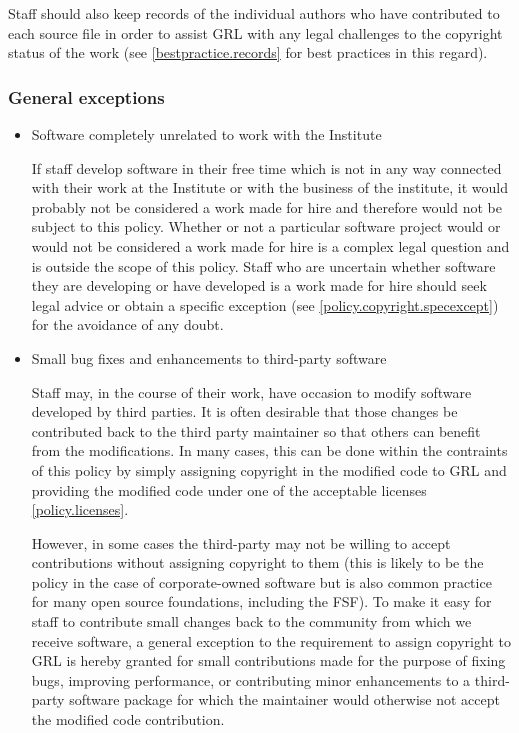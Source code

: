 \documentclass[10pt,a4paper]{article}
\begin{document}
\par Staff should also keep records of the individual authors who have contributed to 
each source file in order to assist GRL with any legal challenges to the copyright 
status of the work (see \ref{bestpractice.records} for best practices in this regard). 


\subsubsection{General exceptions}
\label{policy.copyright.genexcept}
\begin{itemize}

\item Software completely unrelated to work with the Institute

\par If staff develop software in their free time which is not in any way connected 
with their work at the Institute or with the business of the institute, it would 
probably not be considered a work made for hire and therefore would not be 
subject to this policy. Whether or not a particular software project would or 
would not be considered a work made for hire is a complex legal question and 
is outside the scope of this policy. Staff who are uncertain whether software 
they are developing or have developed is a work made for hire should seek 
legal advice or obtain a specific exception (see \ref{policy.copyright.specexcept}) 
for the avoidance of any doubt. 

\item Small bug fixes and enhancements to third-party software

\par Staff may, in the course of their work, have occasion to modify software 
developed by third parties. It is often desirable that those changes be contributed 
back to the third party maintainer so that others can benefit from the modifications. 
In many cases, this can be done within the contraints of this policy by simply 
assigning copyright in the modified code to GRL and providing the modified code 
under one of the acceptable licenses \ref{policy.licenses}. 

\par However, in some cases the third-party may not be willing to accept contributions 
without assigning copyright to them (this is likely to be the policy in the case of 
corporate-owned software but is also common practice for many open source 
foundations, including the FSF). To make it easy for staff to contribute small 
changes back to the community from which we receive software, a general 
exception to the requirement to assign copyright to GRL is hereby granted for 
small contributions made for the purpose of fixing bugs, improving performance, 
or contributing minor enhancements to a third-party software package for which 
the maintainer would otherwise not accept the modified code contribution. 


\end{itemize}
\end{document}
